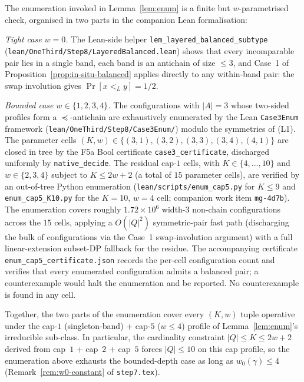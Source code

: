 \begin{remark}\label{rem:enumeration}
The enumeration invoked in Lemma~\ref{lem:enum} is a finite but
$w$-parametrised check, organised in two parts in the companion
Lean formalisation:

\smallskip\emph{Tight case $w = 0$.} The Lean-side helper
\verb|lem_layered_balanced_subtype|
(\texttt{lean/OneThird/Step8/LayeredBalanced.lean}) shows that every
incomparable pair lies in a single band, each band is an antichain
of size $\le 3$, and Case~1 of
Proposition~\ref{prop:in-situ-balanced} applies directly to any
within-band pair: the swap involution gives $\Pr[x <_L y] = 1/2$.

\smallskip\emph{Bounded case $w \in \{1, 2, 3, 4\}$.} The
configurations with $|A| = 3$ whose two-sided profiles form a
$\preceq$-antichain are exhaustively enumerated by the Lean
\texttt{Case3Enum} framework
(\texttt{lean/OneThird/Step8/Case3Enum/}) modulo the symmetries of
(L1). The parameter cells $(K, w) \in \{(3,1), (3,2), (3,3),
(3,4), (4,1)\}$ are closed in tree by the F5a Bool certificate
\texttt{case3\_certificate}, discharged uniformly by
\texttt{native\_decide}. The residual cap-$1$ cells, with $K \in
\{4, \ldots, 10\}$ and $w \in \{2, 3, 4\}$ subject to $K \le 2w+2$
(a total of $15$ parameter cells), are verified by an out-of-tree
Python enumeration (\texttt{lean/scripts/enum\_cap5.py} for $K \le
9$ and \texttt{enum\_cap5\_K10.py} for the $K = 10$, $w = 4$ cell;
companion work item \texttt{mg-4d7b}). The enumeration covers
roughly $1.72\times 10^6$ width-3 non-chain configurations across
the $15$ cells, applying a $O(|Q|^2)$ symmetric-pair fast path
(discharging the bulk of configurations via the Case~1
swap-involution argument) with a full linear-extension subset-DP
fallback for the residue. The accompanying certificate
\texttt{enum\_cap5\_certificate.json} records the per-cell
configuration count and verifies that every enumerated configuration
admits a balanced pair; a counterexample would halt the enumeration
and be reported. No counterexample is found in any cell.

\smallskip Together, the two parts of the enumeration cover every
$(K, w)$ tuple operative under the cap-$1$ (singleton-band) +
cap-$5$ ($w \le 4$) profile of Lemma~\ref{lem:enum}'s irreducible
sub-class. In particular, the cardinality constraint
$|Q| \le K \le 2w + 2$ derived from cap~$1$ + cap~$2$ + cap~$5$
forces $|Q| \le 10$ on this cap profile, so the enumeration above
exhausts the bounded-depth case as long as $w_0(\gamma) \le 4$
(Remark~\ref{rem:w0-constant} of \texttt{step7.tex}).
\end{remark}

